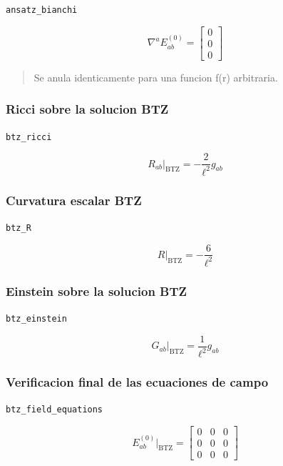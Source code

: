 \documentclass[11pt,a4paper]{article}
\begin{document}
\noindent\texttt{ansatz\_bianchi}\par\nopagebreak[4]

\[
\nabla^aE^{(0)}_{ab} = \left[\begin{matrix}0\\0\\0\end{matrix}\right]
\]

\begin{quote}\small Se anula identicamente para una funcion f(r) arbitraria.\end{quote}

\subsubsection{Ricci sobre la solucion BTZ}

\noindent\texttt{btz\_ricci}\par\nopagebreak[4]

\[
R_{ab}\big|_{\mathrm{BTZ}} = -\frac{2}{\ell^2}g_{ab}
\]

\subsubsection{Curvatura escalar BTZ}

\noindent\texttt{btz\_R}\par\nopagebreak[4]

\[
R\big|_{\mathrm{BTZ}} = - \frac{6}{\ell^{2}}
\]

\subsubsection{Einstein sobre la solucion BTZ}

\noindent\texttt{btz\_einstein}\par\nopagebreak[4]

\[
G_{ab}\big|_{\mathrm{BTZ}} = \frac{1}{\ell^2}g_{ab}
\]

\subsubsection{Verificacion final de las ecuaciones de campo}

\noindent\texttt{btz\_field\_equations}\par\nopagebreak[4]

\[
E^{(0)}_{ab}\big|_{\mathrm{BTZ}} = \left[\begin{matrix}0 & 0 & 0\\0 & 0 & 0\\0 & 0 & 0\end{matrix}\right]
\]
\end{document}
